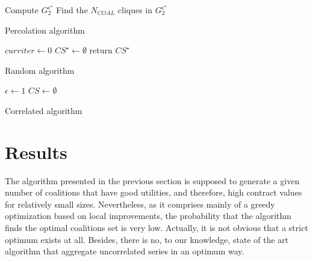 \documentclass[conference]{IEEEtran}
\begin{document}
\begin{algorithm}
\label{alg:algo1}
 Compute $ G_{2}^{\epsilon^{\star}} $ \;
 Find the $ N_{COAL} $ cliques in $ G_{2}^{\epsilon^{\star}} $\;
 \caption{Percolation algorithm}
\end{algorithm}

\begin{algorithm}
\label{alg:algo2}
 $ curriter \leftarrow 0 $ \;
 $ CS^{\star} \leftarrow \emptyset $\;
  return $ CS^{\star} $
 \caption{Random algorithm}
\end{algorithm}

\begin{algorithm}
\label{alg:algo3}
 $ \epsilon \leftarrow 1 $ \;
 $ CS \leftarrow \emptyset $\;
 \caption{Correlated algorithm}
\end{algorithm}

\section{Results}

The algorithm presented in the previous section is supposed to generate a given number of coalitions that have good utilities, and therefore, high contract values for relatively small sizes. Nevertheless, as it comprises mainly of a greedy optimization based on local improvements, the probability that the algorithm finds the optimal coalitions set is very low. Actually, it is not obvious that a strict optimum exists at all. Besides, there is no, to our knowledge, state of the art algorithm that aggregate uncorrelated series in an optimum way.
\end{document}
